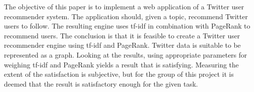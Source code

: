 The objective of this paper is to implement a web application of a Twitter user
recommender system. The application should, given a topic, recommend Twitter
users to follow. The resulting engine uses tf-idf in combination with PageRank
to recommend users. The conclusion is that it is feasible to create a Twitter
user recommender engine using tf-idf and PageRank. Twitter data is suitable to
be represented as a graph. Looking at the results, using appropriate parameters
for weighing tf-idf and PageRank yields a result that is satisfying. Measuring
the extent of the satisfaction is subjective, but for the group of this project
it is deemed that the result is satisfactory enough for the given task.
